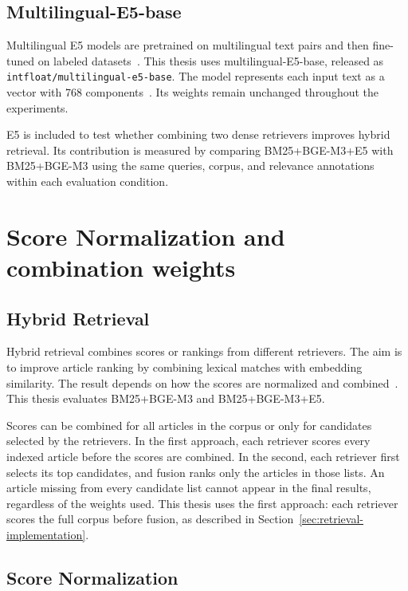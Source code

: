 \subsection{Multilingual-E5-base}

Multilingual E5 models are pretrained on multilingual text pairs and then fine-tuned on labeled datasets~\cite{wang2024}. This thesis uses multilingual-E5-base, released as \texttt{intfloat/multilingual-e5-base}. The model represents each input text as a vector with 768 components~\cite{e5basecard}. Its weights remain unchanged throughout the experiments.

E5 is included to test whether combining two dense retrievers improves hybrid retrieval. Its contribution is measured by comparing BM25+BGE-M3+E5 with BM25+BGE-M3 using the same queries, corpus, and relevance annotations within each evaluation condition.

\section{Score Normalization and combination weights}
\subsection{Hybrid Retrieval}

Hybrid retrieval combines scores or rankings from different retrievers. The aim is to improve article ranking by combining lexical matches with embedding similarity. The result depends on how the scores are normalized and combined~\cite{bruch2022}. This thesis evaluates BM25+BGE-M3 and BM25+BGE-M3+E5.

Scores can be combined for all articles in the corpus or only for candidates selected by the retrievers. In the first approach, each retriever scores every indexed article before the scores are combined. In the second, each retriever first selects its top candidates, and fusion ranks only the articles in those lists. An article missing from every candidate list cannot appear in the final results, regardless of the weights used. This thesis uses the first approach: each retriever scores the full corpus before fusion, as described in Section~\ref{sec:retrieval-implementation}.

\subsection{Score Normalization}

